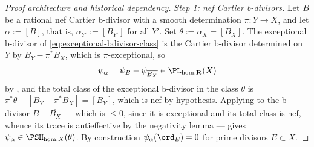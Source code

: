 \begin{proof}[Proof architecture and historical dependency]
\medskip
\noindent\emph{Step 1: nef Cartier b-divisors.}
Let $B$ be a rational nef Cartier b-divisor with a smooth determination
$\pi:Y\to X$, and let $\alpha:=[B]$, that is,
$\alpha_{Y'}:=[B_{Y'}]$ for all $Y'$.  Set
$\theta:=\alpha_X=[B_X]$.  The exceptional b-divisor of
\eqref{eq:exceptional-bdivisor-class} is the Cartier b-divisor determined on
$Y$ by $B_Y-\pi^*B_X$, which is $\pi$-exceptional, so
\[
 \psi_\alpha=\psi_{B}-\psi_{\overline{B_X}}\in\PL_{\mathrm{hom},\mathbf R}(X)
\]
by , and the total class of the
exceptional b-divisor in the class $\theta$ is
$\pi^*\theta+[B_Y-\pi^*B_X]=[B_Y]$, which is nef by hypothesis.  Applying
 to the b-divisor
$B-\overline{B_X}$ --- which is $\leq0$, since it is exceptional and
its total class is nef, whence its trace is antieffective by the negativity
lemma --- gives $\psi_\alpha\in\PSH_{\mathrm{hom},X}(\theta)$.  By
construction $\psi_\alpha(\ord_E)=0$ for prime divisors $E\subset X$.


\end{proof}
